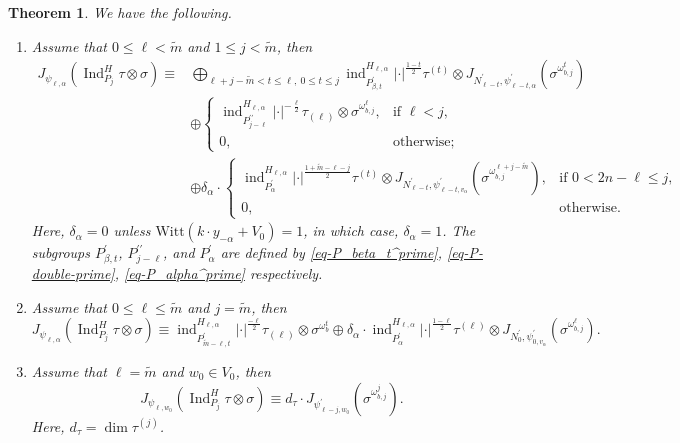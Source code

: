 \documentclass[12pt]{amsart}
\newcommand{\ind}{\operatorname{ind}}
\newcommand{\wt}{\widetilde}
\newtheorem{theorem}{Theorem}[section]
\theoremstyle{remark}
\DeclareMathOperator{\Ind}{Ind}
\begin{document}
\begin{theorem}
\label{thm-JacquetModule}
 We have the following. 
\begin{enumerate}
\item Assume that $0\leq \ell <\wt m$ and $1\leq j <\wt m$, then
$$
\begin{aligned} J_{\psi_{\ell, \alpha}}(\Ind_{P_j}^H \tau\otimes \sigma)\equiv
&\bigoplus_{\ell+j-\wt m<t\leq \ell,\ 0\leq t \leq j}
\ind_{P^\prime_{\beta,t}}^{H_{\ell,\alpha}} |\cdot|^{\frac{1-t}{2}} \tau^{(t)} \otimes J_{N_{\ell-t}^\prime, \psi_{\ell-t,\alpha} ^\prime}(\sigma^{\omega_{b,j}^t})\\
&\oplus \begin{cases}
            \ind_{P_{j-\ell}^{\prime\prime}}^{H_{\ell,\alpha}} |\cdot|^{-\frac{\ell}{2}} \tau_{(\ell)}\otimes \sigma^{\omega_{b,j}^{\ell}}, & \text{if $\ell<j$},\\
            0, & \text{otherwise};
           \end{cases}\\
&\oplus \delta_{\alpha}\cdot
\begin{cases}
 \ind_{P_{\alpha}^{\prime}}^{H_{\ell,\alpha}} |\cdot|^{\frac{1+\wt m-\ell-j}{2}} \tau^{(t)}\otimes  J_{N_{\ell-t}^\prime, \psi_{\ell-t,v_\alpha} ^\prime}(\sigma^{\omega_{b,j}^{\ell+j-\wt m}}), & \text{if $0<2n-\ell \leq j$},\\
 0, & \text{otherwise}.
\end{cases}
\end{aligned}
$$
Here, $\delta_\alpha=0$ unless $\mathrm{Witt}(k\cdot y_{-\alpha}+V_0)=1$, in which case, $\delta_\alpha=1$. The subgroups $P_{\beta,t}^\prime$, $P_{j-\ell}^{\prime\prime}$, and $P_{\alpha}^\prime$ are defined by  \eqref{eq-P_beta_t^prime}, \eqref{eq-P-double-prime}, \eqref{eq-P_alpha^prime} respectively.
\item Assume that $0\leq \ell \leq \wt m$ and $j=\wt m$, then
 $$
 J_{\psi_{\ell, \alpha}}(\Ind_{P_j}^H \tau\otimes \sigma) \equiv
\ind_{P^\prime_{\wt m-\ell ,t}}^{H_{\ell,\alpha}} |\cdot|^{\frac{-\ell}{2}} \tau_{(\ell)} \otimes  \sigma^{\omega_b^t}
\oplus
 \delta_\alpha\cdot \ind_{P_{\alpha}^{\prime}}^{H_{\ell,\alpha}} |\cdot|^{\frac{1-\ell}{2}} \tau^{(\ell)}\otimes  J_{N_{0}^\prime, \psi_{0,v_\alpha} ^\prime}(\sigma^{\omega_{b,j}^\ell}).
 $$

  \item Assume that $\ell=\wt m$ and $w_0\in V_0$, then
 $$J_{\psi_{\ell,w_0}}(\Ind_{P_j}^H \tau\otimes \sigma)\equiv d_\tau\cdot  J_{\psi_{\ell-j,w_0}^\prime}( \sigma^{\omega_{b,j}^j}).$$
 Here, $d_\tau=\dim \tau^{(j)}$.
\end{enumerate}
 \end{theorem}
\end{document}
